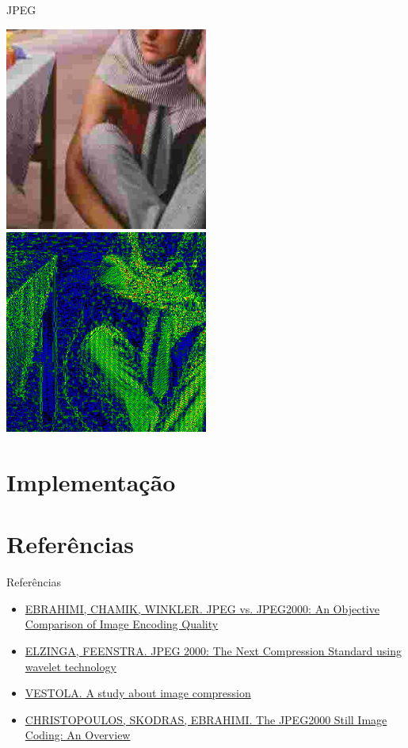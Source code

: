 \documentclass{beamer}
\begin{document}
\begin{frame}{JPEG}
   \begin{multicols}{2}
      \includegraphics[width=0.5\textwidth]{figure/JPEG_barbara010.jpg}
      \includegraphics[width=0.5\textwidth]{figure/psnr_JPEG_barbara010.png}
   \end{multicols}
\end{frame}


\section{Implementação}
\section{Referências}
\begin{frame}{Referências}
   \begin{itemize}
      \item \href{http://stefan.winklerbros.net/Publications/adip2004.pdf}{EBRAHIMI, CHAMIK, WINKLER. JPEG vs. JPEG2000: An Objective Comparison of Image Encoding Quality}
      \item \href{http://faculty.gvsu.edu/aboufade/web/wavelets/student_work/EF/}{ELZINGA, FEENSTRA. JPEG 2000: The Next Compression Standard using wavelet technology}
      \item \href{http://www.mvnet.fi/index.php?osio=Tutkielmat&luokka=Yliopisto&sivu=Image_compression}{VESTOLA. A study about image compression}
      \item \href{http://web.stanford.edu/class/ee398a/handouts/papers/Christopoulos\%20-\%20JPEG2000.pdf}{CHRISTOPOULOS, SKODRAS, EBRAHIMI. The JPEG2000 Still Image Coding: An Overview}
   \end{itemize}
\end{frame}
\end{document}
